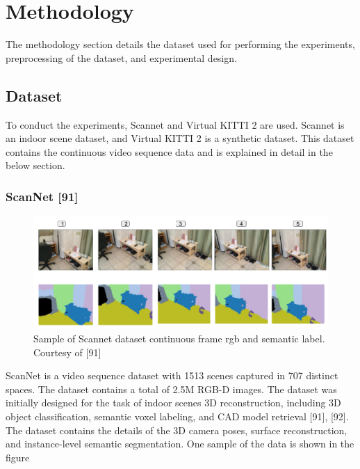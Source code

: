 

    \chapter{Methodology}
	\label{chap:methodology}
	
	The methodology section details the dataset used for performing the experiments, preprocessing of the dataset, and experimental design.

    \section{Dataset}
    
	To conduct the experiments, Scannet and Virtual KITTI 2 are used. Scannet is an indoor scene dataset, and Virtual KITTI 2 is a synthetic dataset. This dataset contains the continuous video sequence data and is explained in detail in the below section.
    
    \subsection{ScanNet [91]}

	\begin{figure}
		\centering
		\includegraphics[width=17cm]{images/images_segm_scannet.png}
		\caption{Sample of Scannet dataset continuous frame rgb and semantic label. Courtesy of [91] }
		\label{fig:sample_rgb_seg_scannet}
	\end{figure}
        
	ScanNet is a video sequence dataset with 1513 scenes captured in 707 distinct spaces. The dataset contains a total of 2.5M RGB-D images. The dataset was initially designed for the task of indoor scenes 3D reconstruction, including 3D object classification, semantic voxel labeling, and CAD model retrieval [91], [92]. The dataset contains the details of the 3D camera poses, surface reconstruction, and instance-level semantic segmentation. One sample of the data is shown in the figure
	
